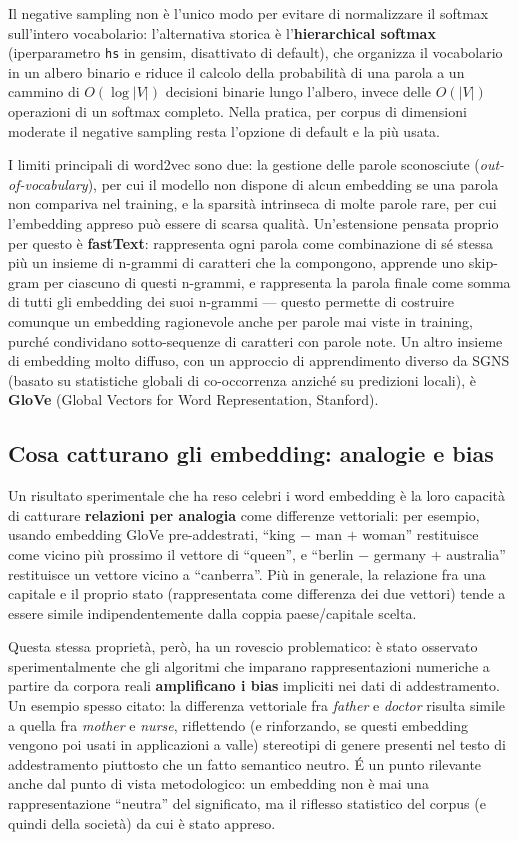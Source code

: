 \documentclass[11pt,a4paper]{report}
\begin{document}
Il negative sampling non è l'unico modo per evitare di normalizzare il softmax sull'intero vocabolario: l'alternativa storica è l'\textbf{hierarchical softmax} (iperparametro \texttt{hs} in gensim, disattivato di default), che organizza il vocabolario in un albero binario e riduce il calcolo della probabilità di una parola a un cammino di $O(\log |V|)$ decisioni binarie lungo l'albero, invece delle $O(|V|)$ operazioni di un softmax completo. Nella pratica, per corpus di dimensioni moderate il negative sampling resta l'opzione di default e la più usata.

I limiti principali di word2vec sono due: la gestione delle parole sconosciute (\emph{out-of-vocabulary}), per cui il modello non dispone di alcun embedding se una parola non compariva nel training, e la sparsità intrinseca di molte parole rare, per cui l'embedding appreso può essere di scarsa qualità. Un'estensione pensata proprio per questo è \textbf{fastText}: rappresenta ogni parola come combinazione di sé stessa più un insieme di n-grammi di caratteri che la compongono, apprende uno skip-gram per ciascuno di questi n-grammi, e rappresenta la parola finale come somma di tutti gli embedding dei suoi n-grammi --- questo permette di costruire comunque un embedding ragionevole anche per parole mai viste in training, purché condividano sotto-sequenze di caratteri con parole note. Un altro insieme di embedding molto diffuso, con un approccio di apprendimento diverso da SGNS (basato su statistiche globali di co-occorrenza anziché su predizioni locali), è \textbf{GloVe} (Global Vectors for Word Representation, Stanford).

\subsection{Cosa catturano gli embedding: analogie e bias}

Un risultato sperimentale che ha reso celebri i word embedding è la loro capacità di catturare \textbf{relazioni per analogia} come differenze vettoriali: per esempio, usando embedding GloVe pre-addestrati, ``king $-$ man $+$ woman'' restituisce come vicino più prossimo il vettore di ``queen'', e ``berlin $-$ germany $+$ australia'' restituisce un vettore vicino a ``canberra''. Più in generale, la relazione fra una capitale e il proprio stato (rappresentata come differenza dei due vettori) tende a essere simile indipendentemente dalla coppia paese/capitale scelta.

Questa stessa proprietà, però, ha un rovescio problematico: è stato osservato sperimentalmente che gli algoritmi che imparano rappresentazioni numeriche a partire da corpora reali \textbf{amplificano i bias} impliciti nei dati di addestramento. Un esempio spesso citato: la differenza vettoriale fra \emph{father} e \emph{doctor} risulta simile a quella fra \emph{mother} e \emph{nurse}, riflettendo (e rinforzando, se questi embedding vengono poi usati in applicazioni a valle) stereotipi di genere presenti nel testo di addestramento piuttosto che un fatto semantico neutro. \'E un punto rilevante anche dal punto di vista metodologico: un embedding non è mai una rappresentazione ``neutra'' del significato, ma il riflesso statistico del corpus (e quindi della società) da cui è stato appreso.
\end{document}
